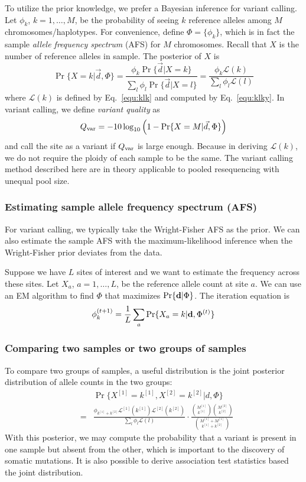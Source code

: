 \documentclass{bioinfo}
\begin{document}
\begin{methods}
To utilize the prior knowledge, we prefer a Bayesian inference for variant calling.
Let $\phi_k$, $k=1,\ldots,M$, be the probability of seeing $k$ reference alleles
among $M$ chromosomes/haplotypes. For convenience, define $\Phi=\{\phi_k\}$, which
is in fact the sample \emph{allele frequency spectrum} (AFS) for $M$ chromosomes. Recall
that $X$ is the number of reference alleles in sample. The posterior of $X$ is
$$
\Pr\{X=k|\vec{d},\Phi\}=\frac{\phi_k\Pr\{\vec{d}|X=k\}}{\sum_l\phi_l\Pr\{\vec{d}|X=l\}}
=\frac{\phi_k\mathcal{L}(k)}{\sum_l\phi_l\mathcal{L}(l)}
$$
where $\mathcal{L}(k)$ is defined by Eq.~\eqref{equ:klk} and computed by Eq.~\eqref{equ:klky}.
In variant calling, we define \emph{variant quality} as
$$
Q_{\rm var}=-10\log_{10}\Big(1-\Pr\{X=M|\vec{d},\Phi\}\Big)
$$
and call the site as a variant if $Q_{\rm var}$ is large enough. Because in deriving
$\mathcal{L}(k)$, we do not require the ploidy of each sample to be the same. The
variant calling method described here are in theory applicable to pooled resequencing with unequal pool size.

\subsubsection{Estimating sample allele frequency spectrum (AFS)}
For variant calling, we typically take the Wright-Fisher AFS as the prior. We can also
estimate the sample AFS with the maximum-likelihood inference when the Wright-Fisher prior
deviates from the data.

Suppose we have $L$ sites of interest and we want to estimate the frequency across these sites.
Let $X_a$, $a=1,\ldots,L$, be the reference allele count at site $a$. We can use an EM algorithm
to find $\Phi$ that maximizes $\Pr\{{\bf d}|\Phi\}$. The iteration equation is
$$
\phi_k^{(t+1)}=\frac{1}{L}\sum_a\Pr\{X_a=k|{\bf d},\Phi^{(t)}\}
$$
\subsubsection{Comparing two samples or two groups of samples}
To compare two groups of samples, a useful distribution is the joint posterior distribution
of allele counts in the two groups:
\begin{eqnarray*}
&&\Pr\{X^{[1]}=k^{[1]},X^{[2]}=k^{[2]}|d,\Phi\}\\
&=&\frac{\phi_{k^{[1]}+k^{[2]}}\mathcal{L}^{[1]}(k^{[1]})\mathcal{L}^{[2]}(k^{[2]})}{\sum_l\phi_l\mathcal{L}(l)}
\cdot\frac{\binom{M^{[1]}}{k^{[1]}}\binom{M^{[2]}}{k^{[2]}}}{\binom{M^{[1]}+M^{[1]}}{k^{[1]}+k^{[2]}}}
\end{eqnarray*}
With this posterior, we may compute the probability that a variant is
present in one sample but absent from the other, which is important to
the discovery of somatic mutations. It is also possible to derive association test
statistics based the joint distribution.

\end{methods}
\end{document}
